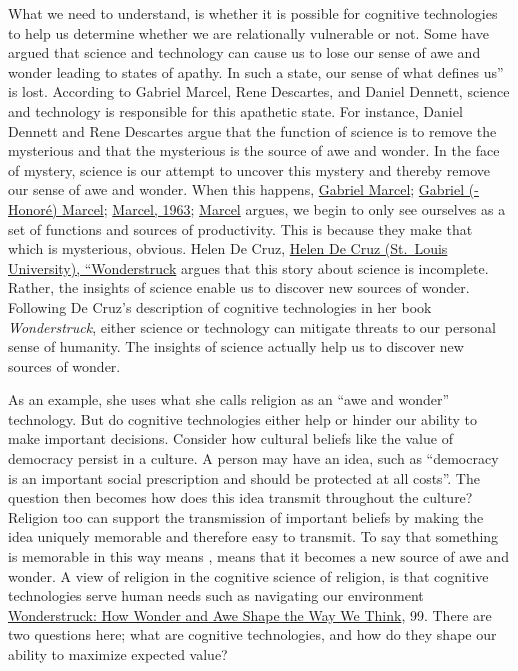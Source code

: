\documentclass[
  letterpaper,
  DIV=11,
  numbers=noendperiod]{scrartcl}
\begin{document}
What we need to understand, is whether it is possible for cognitive
technologies to help us determine whether we are relationally vulnerable
or not. Some have argued that science and technology can cause us to
lose our sense of awe and wonder leading to states of apathy. In such a
state, our sense of what defines us'' is lost. According to Gabriel
Marcel, Rene Descartes, and Daniel Dennett, science and technology is
responsible for this apathetic state. For instance, Daniel Dennett and
Rene Descartes argue that the function of science is to remove the
mysterious and that the mysterious is the source of awe and wonder. In
the face of mystery, science is our attempt to uncover this mystery and
thereby remove our sense of awe and wonder. When this happens,
\href{https://app.notion.com/p/Gabriel-Marcel-34e8935bcf8a807591b4ec125449f587?pvs=21}{Gabriel
Marcel};
\href{https://app.notion.com/p/Gabriel-Honor-Marcel-34e8935bcf8a8186ae6bf6f7f42620c3?pvs=21}{Gabriel
(-Honoré) Marcel};
\href{https://app.notion.com/p/Marcel-1963-3398935bcf8a81749beec431c008b39e?pvs=21}{Marcel,
1963};
\href{https://app.notion.com/p/Marcel-3368935bcf8a8164b67de48748ff5b26?pvs=21}{Marcel}
argues, we begin to only see ourselves as a set of functions and sources
of productivity. This is because they make that which is mysterious,
obvious. Helen De Cruz,
\href{https://app.notion.com/p/Helen-De-Cruz-St-Louis-University-Wonderstruck-34e8935bcf8a81d3bd0bdb8052e66acc?pvs=21}{Helen
De Cruz (St.~Louis University), ``Wonderstruck} argues that this story
about science is incomplete. Rather, the insights of science enable us
to discover new sources of wonder. Following De Cruz's description of
cognitive technologies in her book \emph{Wonderstruck}, either science
or technology can mitigate threats to our personal sense of humanity.
The insights of science actually help us to discover new sources of
wonder.

As an example, she uses what she calls religion as an ``awe and wonder''
technology. But do cognitive technologies either help or hinder our
ability to make important decisions. Consider how cultural beliefs like
the value of democracy persist in a culture. A person may have an idea,
such as ``democracy is an important social prescription and should be
protected at all costs''. The question then becomes how does this idea
transmit throughout the culture? Religion too can support the
transmission of important beliefs by making the idea uniquely memorable
and therefore easy to transmit. To say that something is memorable in
this way means , means that it becomes a new source of awe and wonder. A
view of religion in the cognitive science of religion, is that cognitive
technologies serve human needs such as navigating our environment
\href{https://app.notion.com/p/Wonderstruck-How-Wonder-and-Awe-Shape-the-Way-We-Think-3578935bcf8a811f827ae4e1b3d146e4?pvs=21}{Wonderstruck:
How Wonder and Awe Shape the Way We Think}, 99. There are two questions
here; what are cognitive technologies, and how do they shape our ability
to maximize expected value?
\end{document}
